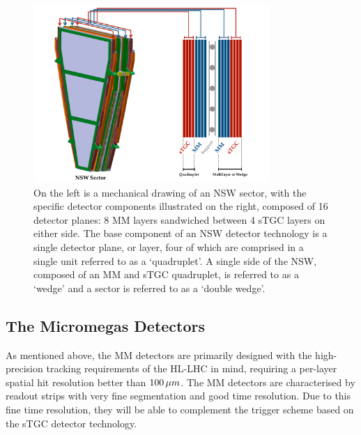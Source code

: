 \begin{figure}[!htb]
    \begin{center}
        \includegraphics[width=0.8\textwidth]{figures/nsw/nsw_sector_layoutPDF}
        \caption{
            On the left is a mechanical drawing of an NSW sector, with the specific detector
            components illustrated on the right, composed of 16 detector planes: 8 MM layers
            sandwiched between 4 sTGC layers on either side.
            The base component of an NSW detector technology is a single detector plane,
            or layer, four of which are comprised in a single unit referred to as
            a `quadruplet'.
            A single side of the NSW, composed of an MM and sTGC quadruplet, is
            referred to as a `wedge' and a sector is referred to as a `double wedge'.
        }
        \label{fig:nsw_sector_layout}
    \end{center}
\end{figure}

\subsection{The Micromegas Detectors}
\label{sec:nsw_mm}

As mentioned above, the MM detectors are primarily designed with the high-precision tracking
requirements of the HL-LHC in mind, requiring a per-layer spatial hit resolution better than $100\,\mu m$.
The MM detectors are characterised by readout strips with very fine segmentation and good
time resolution.
Due to this fine time resolution, they will be able to complement the trigger scheme based
on the sTGC detector technology.

